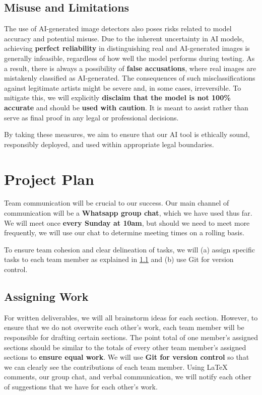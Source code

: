 \documentclass{article} %
\begin{document}
\subsection{Misuse and Limitations}
The use of AI-generated image detectors also poses risks related to model accuracy and potential misuse. Due to the inherent uncertainty in AI models, achieving \textbf{perfect reliability} in distinguishing real and AI-generated images is generally infeasible, regardless of how well the model performs during testing. As a result, there is always a possibility of \textbf{false accusations}, where real images are mistakenly classified as AI-generated. The consequences of such misclassifications against legitimate artists might be severe and, in some cases, irreversible. To mitigate this, we will explicitly \textbf{disclaim that the model is not 100\% accurate} and should be \textbf{used with caution}. It is meant to assist rather than serve as final proof in any legal or professional decisions.

By taking these measures, we aim to ensure that our AI tool is ethically sound, responsibly deployed, and used within appropriate legal boundaries.

\section{Project Plan}
\label{plan}

Team communication will be crucial to our success. Our main channel of communication will be a \textbf{Whatsapp group chat}, which we have used thus far. We will meet once \textbf{every Sunday at 10am}, but should we need to meet more frequently, we will use our chat to determine meeting times on a rolling basis.

To ensure team cohesion and clear delineation of tasks, we will (a) assign specific tasks to each team member as explained in \ref{assigning_work} and (b) use Git for version control.

\subsection{Assigning Work}
\label{assigning_work}

For written deliverables, we will all brainstorm ideas for each section. However, to ensure that we do not overwrite each other's work, each team member will be responsible for drafting certain sections. The point total of one member's assigned sections should be similar to the totals of every other team member's assigned sections to \textbf{ensure equal work}. We will use \textbf{Git for version control} so that we can clearly see the contributions of each team member. Using LaTeX comments, our group chat, and verbal communication, we will notify each other of suggestions that we have for each other's work.
\end{document}
